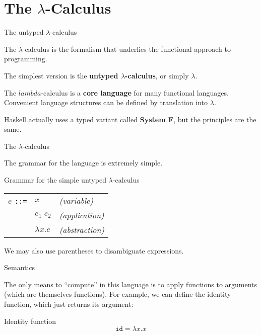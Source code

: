 
\section{The $\lambda$-Calculus}

%
\begin{frame}{The untyped $\lambda$-calculus}

The $\lambda$-calculus is the formalism that underlies the functional approach
to programming.

The simplest version is the \textbf{untyped $\lambda$-calculus}, or simply
$\lambda$.

The $lambda$-calculus is a \textbf{core language} for many functional languages.
Convenient language structures can be defined by translation into $\lambda$.

Haskell actually uses a typed variant called \textbf{System F}, but the
principles are the same.

\end{frame}

%
\begin{frame}{The $\lambda$-calculus}

The grammar for the language is extremely simple.

\begin{block}{Grammar for the simple untyped $\lambda$-calculus}
\begin{tabular}{lll}
  $e$ \texttt{::=} & $x$              & \emph{(variable)} \\
                   & $e_1 \; e_2$     & \emph{(application)} \\
                   & $\lambda x . e$  & \emph{(abstraction)} \\
\end{tabular}
\end{block}

We may also use parentheses to disambiguate expressions.

\end{frame}

%
\begin{frame}{Semantics}

The only means to ``compute'' in this language is to apply functions to
arguments (which are themselves functions). For example, we can define the
identity function, which just returns its argument:

\begin{block}{Identity function}
\[
\mathtt{id} = \lambda x . x
\]
\end{block}

\end{frame}

